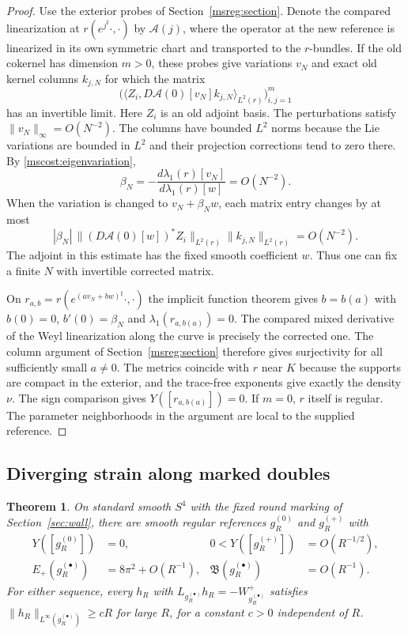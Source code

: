 \documentclass[11pt]{article}
\numberwithin{equation}{section}
\newtheorem{theorem}{Theorem}[section]
\theoremstyle{definition}
\theoremstyle{remark}
\begin{document}
\begin{proof}
Use the exterior probes of Section~\ref{msreg:section}. Denote the
compared linearization at \(r(e^{j^\sharp}\cdot,\cdot)\) by
\(\mathscr A(j)\), where the operator at the new reference is
linearized in its own symmetric chart and transported to the
\(r\)-bundles. If the old cokernel has dimension \(m>0\), these probes
give variations \(v_N\) and exact old kernel columns \(k_{j,N}\)
for which the matrix
\[
 \bigl(\langle Z_i,D\mathscr A(0)[v_N] k_{j,N}\rangle_{L^2(r)}
       \bigr)_{i,j=1}^m
\]
has an invertible limit. Here \(Z_i\) is an old adjoint basis.
The perturbations satisfy \(\|v_N\|_\infty=O(N^{-2})\). The columns
have bounded \(L^2\) norms because the Lie variations are bounded
in \(L^2\) and their projection corrections tend to zero there.
By \eqref{mscost:eigenvariation},
\[
 \beta_N=-\frac{d\lambda_1(r)[v_N]}{d\lambda_1(r)[w]}=O(N^{-2}).
\]
When the variation is changed to \(v_N+\beta_Nw\), each matrix entry
changes by at most
\[
 |\beta_N|\,
     \|(D\mathscr A(0)[w])^*Z_i\|_{L^2(r)}
     \|k_{j,N}\|_{L^2(r)}=O(N^{-2}).
\]
The adjoint in this estimate has the fixed smooth coefficient \(w\).
Thus one can fix a finite \(N\) with invertible corrected matrix.

On \(r_{a,b}=r(e^{(av_N+bw)^\sharp}\cdot,\cdot)\) the implicit
function theorem gives \(b=b(a)\) with \(b(0)=0\),
\(b'(0)=\beta_N\) and \(\lambda_1(r_{a,b(a)})=0\).
The compared mixed derivative of the Weyl linearization along the
curve is precisely the corrected one. The column argument of
Section~\ref{msreg:section} therefore gives surjectivity for all
sufficiently small \(a\ne0\). The metrics coincide with \(r\) near
\(K\) because the supports are compact in the exterior, and the
trace-free exponents give exactly the density \(\nu\). The sign
comparison gives \(Y([r_{a,b(a)}])=0\). If \(m=0\), \(r\) itself is
regular. The parameter neighborhoods in the argument are local
to the supplied reference.
\end{proof}

\subsection{Diverging strain along marked doubles}

\begin{theorem}\label{mscost:doubles}
On standard smooth \(S^4\) with the fixed round marking of
Section~\ref{sec:wall}, there are smooth regular references
\(g_R^{(0)}\) and \(g_R^{(+)}\) with
\[
 \begin{aligned}
 Y([g_R^{(0)}])&=0, &
 0<Y([g_R^{(+)}])&=O(R^{-1/2}),\\
 E_+(g_R^{(\bullet)})&=8\pi^2+O(R^{-1}),&
 \mathfrak B(g_R^{(\bullet)})&=O(R^{-1}) .
 \end{aligned}
\]
For either sequence, every \(h_R\) with
\(L_{g_R^{(\bullet)}}h_R=-W^+_{g_R^{(\bullet)}}\) satisfies
\(\|h_R\|_{L^\infty(g_R^{(\bullet)})}\ge cR\) for large \(R\),
for a constant \(c>0\) independent of \(R\).
\end{theorem}
\end{document}
